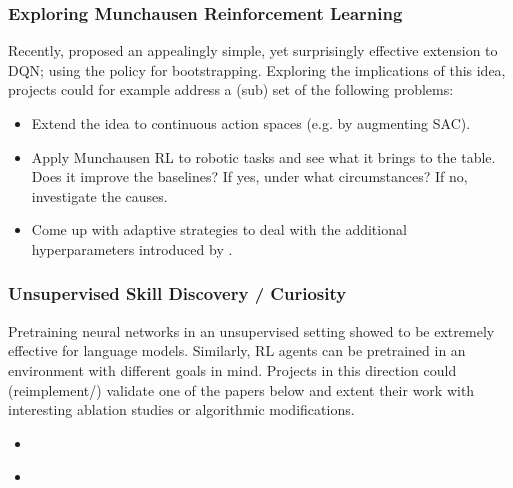 \documentclass[a4paper]{article}
\begin{document}
\subsubsection{Exploring Munchausen Reinforcement Learning}
Recently, \cite{vieillard2020munchausen} proposed an appealingly simple, yet surprisingly effective extension to DQN; using the policy for bootstrapping. Exploring the implications of this idea, projects could for example address a (sub) set of the following problems:

\begin{itemize}
  \item Extend the idea to continuous action spaces (e.g. by augmenting SAC).
  \item Apply Munchausen RL to robotic tasks and see what it brings to the table. Does it improve the baselines? If yes, under what circumstances? If no, investigate the causes.
  \item Come up with adaptive strategies to deal with the additional hyperparameters introduced by \cite{vieillard2020munchausen}.
\end{itemize}

\subsubsection{Unsupervised Skill Discovery / Curiosity}
Pretraining neural networks in an unsupervised setting showed to be extremely effective for language models. Similarly, RL agents can be pretrained in an environment with different goals in mind. Projects in this direction could (reimplement/) validate one of the papers below and extent their work with interesting ablation studies or algorithmic modifications.
\begin{itemize}
  \item \cite{Plan2Explore2020}
  \item \cite{DADS2020}
\end{itemize}

\end{document}
